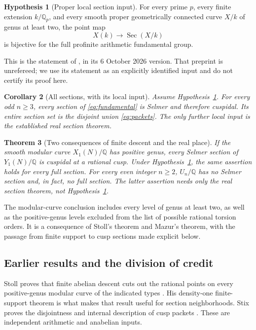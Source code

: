 \documentclass[11pt,a4paper]{article}
\newcommand{\Q}{\mathbb Q}
\DeclareMathOperator{\Sec}{Sec}
\theoremstyle{plain}
\newtheorem{theorem}{Theorem}[section]
\newtheorem{corollary}[theorem]{Corollary}
\theoremstyle{definition}
\newtheorem{hypothesis}[theorem]{Hypothesis}
\begin{document}
\begin{hypothesis}[Proper local section input]\label{hyp:local}
For every prime $p$, every finite extension $k/\Q_p$, and every smooth proper
geometrically connected curve $X/k$ of genus at least two, the point map
\[
 X(k)\longrightarrow\Sec(X/k)
\]
is bijective for the full profinite arithmetic fundamental group.
\end{hypothesis}

This is the statement of \citet[Theorem~1.1, p.~2]{openai}, in its
6 October 2026 version. That preprint is unrefereed; we use its statement as
an explicitly identified input and do not certify its proof here.

\begin{corollary}[All sections, with its local input]\label{cor:all}
Assume Hypothesis~\ref{hyp:local}. For every odd $n\geq3$, every section of
\eqref{eq:fundamental} is Selmer and therefore cuspidal. Its entire section
set is the disjoint union \eqref{eq:packets}. The only further local input
is the established real section theorem.
\end{corollary}

\begin{theorem}[Two consequences of finite descent and the real place]
\label{thm:other}
If the smooth modular curve $X_1(N)/\Q$ has positive genus, every Selmer
section of $Y_1(N)/\Q$ is cuspidal at a rational cusp. Under
Hypothesis~\ref{hyp:local}, the same assertion holds for every full section.
For every even integer $n\geq2$, $U_n/\Q$ has no Selmer section and, in
fact, no full section. The latter assertion needs only the real section
theorem, not Hypothesis~\ref{hyp:local}.
\end{theorem}

The modular-curve conclusion includes every level of genus at least two,
as well as the positive-genus levels excluded from the list of possible
rational torsion orders. It is a consequence of Stoll's theorem and
Mazur's theorem, with the passage from finite support to cusp sections
made explicit below.

\subsection{Earlier results and the division of credit}

Stoll proves that finite abelian descent cuts out the rational points on
every positive-genus modular curve of the indicated types
\citep[Corollary~8.8, pp.~385--386]{stoll}. His density-one finite-support
theorem \citep[Theorem~8.2, pp.~383--384]{stoll} is what makes that result
useful for section neighborhoods. Stix proves the disjointness and internal
description of cusp packets \citep[Proposition~8 and Theorem~14,
pp.~5--6]{stix}. These are independent arithmetic and anabelian inputs.
\end{document}
